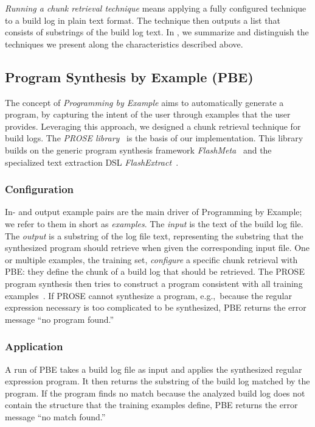 \emph{Running a
chunk retrieval technique} means applying a fully configured
technique to a build log in plain text format.
The technique then outputs a list that consists of substrings of the
build log text.
In , we summarize and distinguish the techniques
we present along the characteristics described above.

\subsection{Program Synthesis by Example (PBE)}
The concept of \emph{Programming by Example} aims to automatically
generate a program, by capturing the
intent of the user through examples that the user provides.
Leveraging this approach, we designed a chunk retrieval technique
for build logs.
The \emph{PROSE library}~\cite{prose2019webpage} is the basis of
our implementation.
This library builds on the generic program synthesis framework
\emph{FlashMeta}~\cite{polozov2015flashmeta:} and the specialized
text extraction DSL \emph{FlashExtract}~\cite{le2014flashextract:}.

\subsubsection{Configuration}
In- and output example pairs are the main driver of Programming by
Example; we refer to them in short as \emph{examples}.
The \emph{input} is the text of the build log file.
The \emph{output} is
a substring of the log file text, representing the
substring that the synthesized program should retrieve when
given the corresponding input file.
One or multiple examples, the
training set, \emph{configure} a specific chunk retrieval with PBE:
they define the chunk of a build log that should be retrieved.
The PROSE program synthesis then tries to construct a program
consistent with all training
examples~\cite{mitchell1982generalization}.
If PROSE cannot synthesize a program, e.g.,\
because the regular expression
necessary is too complicated to be synthesized, PBE returns the
error message ``no program found.''

\subsubsection{Application}
A run of PBE takes a build log file as input and applies the
synthesized regular expression program.
It then returns the substring
of the build log matched by the program.
If the program finds no match because the analyzed build log
does not contain the structure that the training examples define,
PBE returns the error message ``no match found.''

